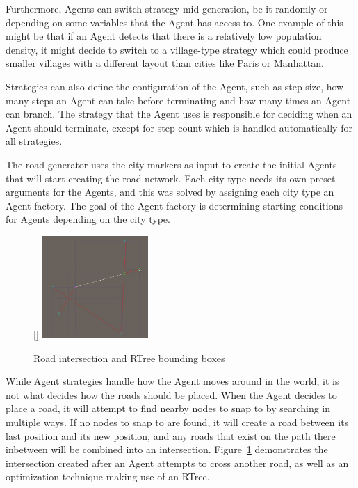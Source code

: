 Furthermore, Agents can switch strategy mid-generation, be it randomly or depending on some variables that the Agent has access to.
One example of this might be that if an Agent detects that there is a relatively low population density, it might decide to switch to a village-type strategy which could produce smaller villages with a different layout than cities like Paris or Manhattan.

Strategies can also define the configuration of the Agent, such as step size, how many steps an Agent can take before terminating and how many times an Agent can branch.
The strategy that the Agent uses is responsible for deciding when an Agent should terminate, except for step count which is handled automatically for all strategies.

The road generator uses the city markers as input to create the initial Agents that will start creating the road network.
Each city type needs its own preset arguments for the Agents, and this was solved by assigning each city type an Agent factory.
The goal of the Agent factory is determining starting conditions for Agents depending on the city type.


\begin{figure}
  \centering
  \raisebox{0pt}[\dimexpr{}\baselineskip\relax]{
    \includegraphics[width=0.36\textwidth]{figure/road_intersection.png}
  }

  \caption{Road intersection and RTree bounding boxes}

  \label{fig:road_intersection}
\end{figure}

While Agent strategies handle how the Agent moves around in the world, it is not what decides how the roads should be placed.
When the Agent decides to place a road, it will attempt to find nearby nodes to snap to by searching in multiple ways.
If no nodes to snap to are found, it will create a road between its last position and its new position, and any roads that exist on the path there inbetween will be combined into an intersection.
Figure~\ref{fig:road_intersection} demonstrates the intersection created after an Agent attempts to cross another road, as well as an optimization technique making use of an RTree. %

